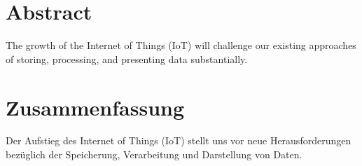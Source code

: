 
\cleardoublepage
{}
\section*{Abstract}

The growth of the Internet of Things (IoT) will challenge our existing approaches of storing, processing, and presenting data substantially.

\newpage
{}
\section*{Zusammenfassung}

Der Aufstieg des Internet of Things (IoT) stellt uns vor neue Herausforderungen bezüglich der Speicherung, Verarbeitung und Darstellung von Daten.
